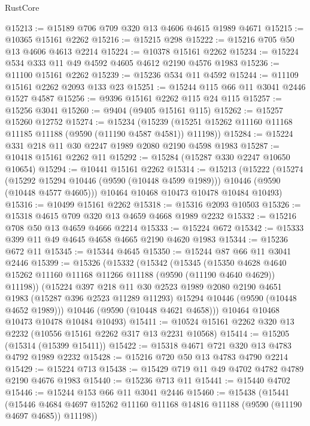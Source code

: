 \begin{lexlean}{RustCore}
\begin{coremodule}
@15213 := @15189 @706 @709 @320 @13 @4606 @4615 @1989 @4671
@15215 := @10365 @15161 @2262
@15216 := @15215 @298
@15222 := @15216 @705 @50 @13 @4606 @4613 @2214
@15224 := @10378 @15161 @2262
@15234 := @15224 @534 @333 @11 @49 @4592 @4605 @4612 @2190 @4576 @1983
@15236 := @11100 @15161 @2262
@15239 := @15236 @534 @11 @4592
@15244 := @11109 @15161 @2262 @2093 @133 @23
@15251 := @15244 @115 @66 @11 @3041 @2446 @1527 @4587
@15256 := @9396 @15161 @2262 @115 @24 @115
@15257 := @15256 @3041
@15260 := @9404 (@9405 @15161 @115)
@15262 := @15257 @15260 @12752
@15274 := @15234
    (@15239 (@15251 @15262 @11160 @11168 @11185 @11188 (@9590 (@11190 @4587 @4581)) @11198))
@15284 := @15224 @331 @218 @11 @30 @2247 @1989 @2080 @2190 @4598 @1983
@15287 := @10418 @15161 @2262 @11
@15292 := @15284 (@15287 @330 @2247 @10650 @10654)
@15294 := @10441 @15161 @2262
@15314 := @15213
    (@15222
      (@15274
        (@15292 @15294 @10446 (@9590 (@10448 @4599 @1989)))
        @10446
        (@9590 (@10448 @4577 @4605)))
      @10464
      @10468
      @10473
      @10478
      @10484
      @10493)
@15316 := @10499 @15161 @2262
@15318 := @15316 @2093 @10503
@15326 := @15318 @4615 @709 @320 @13 @4659 @4668 @1989 @2232
@15332 := @15216 @708 @50 @13 @4659 @4666 @2214
@15333 := @15224 @672
@15342 := @15333 @399 @11 @49 @4645 @4658 @4665 @2190 @4620 @1983
@15344 := @15236 @672 @11
@15345 := @15344 @4645
@15350 := @15244 @87 @66 @11 @3041 @2446
@15399 := @15326
    (@15332
      (@15342
        (@15345
          (@15350
            @4628
            @4640
            @15262
            @11160
            @11168
            @11266
            @11188
            (@9590 (@11190 @4640 @4629))
            @11198))
        (@15224
          @397
          @218
          @11
          @30
          @2523
          @1989
          @2080
          @2190
          @4651
          @1983
          (@15287 @396 @2523 @11289 @11293)
          @15294
          @10446
          (@9590 (@10448 @4652 @1989)))
        @10446
        (@9590 (@10448 @4621 @4658)))
      @10464
      @10468
      @10473
      @10478
      @10484
      @10493)
@15411 := @10524 @15161 @2262 @320 @13 @2232 (@10556 @15161 @2262 @317 @13 @2231 @10568)
@15414 := @15205 (@15314 (@15399 @15411))
@15422 := @15318 @4671 @721 @320 @13 @4783 @4792 @1989 @2232
@15428 := @15216 @720 @50 @13 @4783 @4790 @2214
@15429 := @15224 @713
@15438 := @15429 @719 @11 @49 @4702 @4782 @4789 @2190 @4676 @1983
@15440 := @15236 @713 @11
@15441 := @15440 @4702
@15446 := @15244 @153 @66 @11 @3041 @2446
@15460 := @15438
    (@15441
      (@15446 @4684 @4697 @15262 @11160 @11168 @14816 @11188 (@9590 (@11190 @4697 @4685)) @11198))

\end{coremodule}
\end{lexlean}
